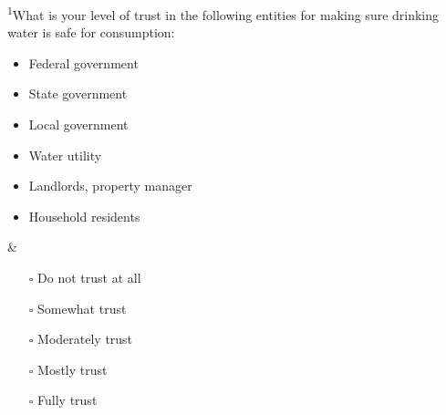 \documentclass[
]{article}
\begin{document}
\begin{longtblr}[         %
caption={},
entry=none,label=none,
note{1}={Matrix style question.},
label=tblr:quest,
caption={Survey questions.},
]
\textsuperscript{1}What is your level of trust in the following entities for making sure drinking water is safe for consumption:    \begin{itemize}[nosep]    \item Federal government    \item State government    \item Local government    \item Water utility    \item Landlords, property manager    \item Household residents    \end{itemize}                                                                                                & \begin{itemize}[nosep]    \item[$\square$] Do not trust at all    \item[$\square$] Somewhat trust    \item[$\square$] Moderately trust    \item[$\square$] Mostly trust    \item[$\square$] Fully trust    \end{itemize}                                                                                                                                                                                                                                                                                                                                                                                                     \\

\end{longtblr}
\end{document}
